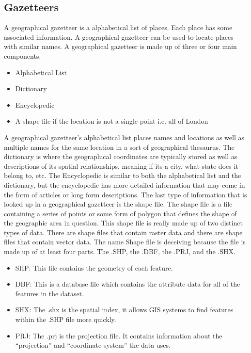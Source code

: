\documentclass[10pt, conference, compsocconf]{IEEEtran}
\begin{document}
\subsection{Gazetteers}
A geographical gazetteer is a alphabetical list of places. Each place has some associated information. A geographical gazetteer can be used to locate places with similar names. A geographical gazetteer is made up of three or four main components. 
\begin{itemize}
    \item Alphabetical List
    \item Dictionary
    \item Encyclopedic
    \item A shape file if the location is not a single point i.e. all of London
\end{itemize}
A geographical gazetteer's alphabetical list places names and locations as well as multiple names for the same location in a sort of geographical thesaurus. The dictionary is where the geographical coordinates are typically stored as well as descriptions of its spatial relationships, meaning if its a city, what state does it belong to, etc. The Encyclopedic is similar to both the alphabetical list and the dictionary, but the encyclopedic has more detailed information that may come in the form of articles or long form descriptions. The last type of information that is looked up in a geographical gazetteer is the shape file. The shape file is a file containing a series of points or some form of polygon that defines the shape of the geographic area in question. This shape file is really made up of two distinct types of data. There are shape files that contain raster data and there are shape files that contain vector data. The name Shape file is deceiving because the file is made up of at least four parts. The .SHP, the .DBF, the .PRJ, and the .SHX. 
\begin{itemize}
    \item{SHP: This file contains the geometry of each feature.}
    \item{DBF: This is a database file which contains the attribute data for all of the features in the dataset.}
    \item{SHX: The .shx is the spatial index, it allows GIS systems to find features within the .SHP file more quickly.}
    \item{PRJ: The .prj is the projection file. It contains information about the “projection” and “coordinate system” the data uses.}
\end{itemize}
\end{document}
